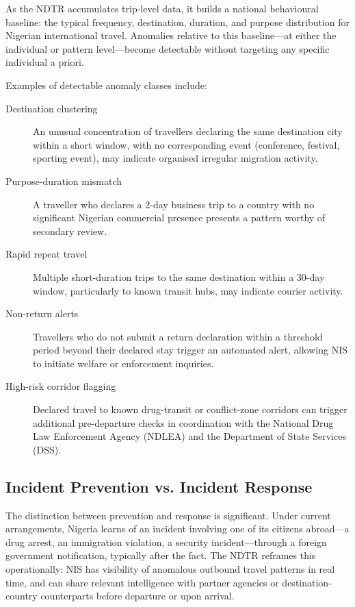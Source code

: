\documentclass[11pt]{article}
\begin{document}
As the NDTR accumulates trip-level data, it builds a national
behavioural baseline: the typical frequency, destination, duration,
and purpose distribution for Nigerian international travel. Anomalies
relative to this baseline---at either the individual or pattern
level---become detectable without targeting any specific individual
a priori.

Examples of detectable anomaly classes include:

\begin{description}
  \item[Destination clustering] An unusual concentration of travellers
  declaring the same destination city within a short window, with
  no corresponding event (conference, festival, sporting event), may
  indicate organised irregular migration activity.

  \item[Purpose-duration mismatch] A traveller who declares a
  2-day business trip to a country with no significant Nigerian
  commercial presence presents a pattern worthy of secondary
  review.

  \item[Rapid repeat travel] Multiple short-duration trips to the
  same destination within a 30-day window, particularly to known
  transit hubs, may indicate courier activity.

  \item[Non-return alerts] Travellers who do not submit a return
  declaration within a threshold period beyond their declared
  stay trigger an automated alert, allowing NIS to initiate
  welfare or enforcement inquiries.

  \item[High-risk corridor flagging] Declared travel to known
  drug-transit or conflict-zone corridors can trigger additional
  pre-departure checks in coordination with the National Drug Law
  Enforcement Agency (NDLEA) and the Department of State Services
  (DSS).
\end{description}

\subsection{Incident Prevention vs. Incident Response}

The distinction between prevention and response is significant.
Under current arrangements, Nigeria learns of an incident involving
one of its citizens abroad---a drug arrest, an immigration
violation, a security incident---through a foreign government
notification, typically after the fact. The NDTR reframes this
operationally: NIS has visibility of anomalous outbound travel
patterns in real time, and can share relevant intelligence with
partner agencies or destination-country counterparts before
departure or upon arrival.
\end{document}
